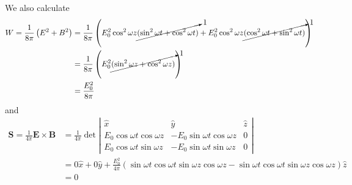 \documentclass[11pt]{article}
\numberwithin{equation}{section}
\begin{document}
    We also calculate 
    \begin{align*}
        W = \frac{1}{8\pi}\left(E^2+B^2\right) &= \frac{1}{8\pi}\left(E_0^2\cos^2\omega{z}\cancelto{1}{(\sin^2\omega{t}+\cos^2\omega{t})} + E_0^2\cos^2\omega{z}\cancelto{1}{(\cos^2\omega{t}+\sin^2\omega{t})}\right)\\
                                               &= \frac{1}{8\pi}\left(E_0^2\cancelto{1}{(\sin^2\omega{z}+\cos^2\omega{z})}\right)\\
                                               &= \frac{E_0^2}{8\pi}
    \end{align*}
    and 
    \begin{align*}
        \mathbf{S} = \frac{1}{4\pi}\mathbf{E}\times\mathbf{B} &= \frac{1}{4\pi}\det\left|\begin{array}{ccc}
                                                \hat{x}                       &\hat{y}                       &\hat{z}\\
                                                E_0\cos\omega{t}\cos\omega{z} &-E_0\sin\omega{t}\cos\omega{z} &0 \\
                                                E_0\cos\omega{t}\sin\omega{z} &-E_0\sin\omega{t}\sin\omega{z} &0 
                                                                    \end{array}\right|\\
                                                                    &= 0\hat{x} + 0\hat{y} + \frac{E_0^2}{4\pi}(\sin\omega{t}\cos\omega{t}\sin\omega{z}\cos\omega{z}-\sin\omega{t}\cos\omega{t}\sin\omega{z}\cos\omega{z})\hat{z}\\
                                                &=0
    \end{align*}
\end{document}
